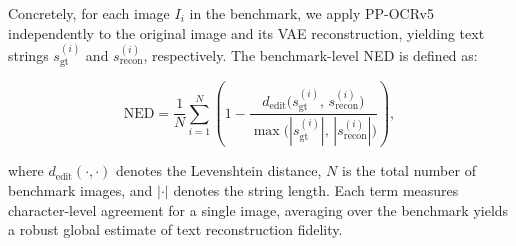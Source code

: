 Concretely, for each image $I_i$ in the benchmark, we apply PP-OCRv5 independently to the original image and its VAE reconstruction, yielding text strings $s_{\mathrm{gt}}^{(i)}$ and $s_{\mathrm{recon}}^{(i)}$, respectively. The benchmark-level NED is defined as:

\begin{equation}
\mathrm{NED} = \frac{1}{N}\sum_{i=1}^{N}\left(1 - \frac{d_{\mathrm{edit}}\!\bigl(s_{\mathrm{gt}}^{(i)},\, s_{\mathrm{recon}}^{(i)}\bigr)}{\max\!\bigl(|s_{\mathrm{gt}}^{(i)}|,\, |s_{\mathrm{recon}}^{(i)}|\bigr)}\right),
\label{eq:ocr_ned}
\end{equation}

where $d_{\mathrm{edit}}(\cdot,\cdot)$ denotes the Levenshtein distance, $N$ is the total number of benchmark images, and $|\cdot|$ denotes the string length. Each term measures character-level agreement for a single image, averaging over the benchmark yields a robust global estimate of text reconstruction fidelity.
